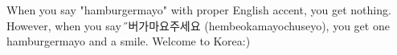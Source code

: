 \begin{post}
	\begin{content}
\begin{blockquote}When you say "hamburgermayo" with proper English accent, you get nothing. However, when you say {\H 햄버가마요주세요} (hembeokamayochuseyo), you get one hamburgermayo and a smile. Welcome to Korea:)\end{blockquote}
	\end{content}
\end{post}
